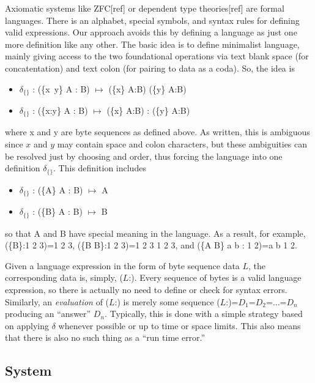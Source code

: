 \documentclass[11pt]{article}
\begin{document}
Axiomatic systems like ZFC[ref] or dependent type theories[ref] are formal languages.  There is an alphabet, special symbols, and syntax rules 
for defining valid expressions.  Our approach avoids this by defining a language as just one more definition like any other.  The basic idea is to 
define minimalist language, mainly giving access to the two foundational operations via text blank space (for concatentation) and text colon (for pairing to data as a coda).  So, the idea is 
\begin{itemize}
\item {$\delta_{\{\}}$ : (\{x\ y\} A : B) $\mapsto$ (\{x\} A:B) (\{y\} A:B)}
\item {$\delta_{\{\}}$ : (\{x:y\} A : B) $\mapsto$ (\{x\} A:B) : (\{y\} A:B)}
\end{itemize}
where x and y are byte sequences as defined above.  As written, this is ambiguous since $x$ and $y$ may contain space and colon characters, but 
these ambiguities can be resolved just by choosing and order, thus forcing the language into one definition 
$\delta_{\{\}}$.  This definition includes 
\begin{itemize}
\item {$\delta_{\{\}}$ : (\{A\} A : B) $\mapsto$ A}
\item {$\delta_{\{\}}$ : (\{B\} A : B) $\mapsto$ B}
\end{itemize}
so that A and B have special meaning in the language.  As a result, for example, (\{B\}:1 2 3)=1 2 3, (\{B B\}:1 2 3)=1 2 3 1 2 3, and (\{A B\} a b : 1 2)=a b 1 2.  

     Given a language expression in the form of byte sequence data $L$, the corresponding data is, simply, ($L$:).  Every sequence of bytes is a valid language 
expression, so there is actually no need to define or check for syntax errors.  Similarly, an {\it evaluation} of ($L$:) is merely some sequence 
($L$:)=$D_1$=$D_2$=$\dots$=$D_n$ producing an ``answer'' $D_n$.  Typically, this is done with a simple strategy based on applying $\delta$ whenever 
possible or up to time or space limits.  This also means that there is also no such thing as a ``run time error.''    

\subsection{System} 
\end{document}
